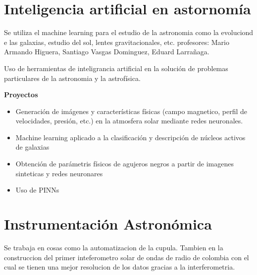 \documentclass{article}
\begin{document}
\section{Inteligencia artificial en astornomía }
Se utiliza el machine learning para el estudio de la astronomia como la evoluciond e las galaxias, estudio del sol, lentes gravitacionales, etc. profesores: Mario Armando Higuera, Santiago Vasgas Dominguez, Eduard Larrañaga. 

Uso de herramientas de inteligrancia artificial en la solución de problemas particulares de la astronomia y la astrofísica. 

\hfill

\textbf{Proyectos }
\begin{itemize}
  \item Generación de imágenes y características físicas (campo magnetico, perfil de velocidades, presión, etc.) en la atmosfera solar mediante redes neuronales. 
  \item Machine learning aplicado a la clasificación y descripción de núcleos activos de galaxias 
  \item Obtención de parámetris físicos de agujeros negros a partir de imagenes sinteticas y redes neuronares 
  \item Uso de PINNs
\end{itemize}

\section{Instrumentación Astronómica }
Se trabaja en cosas como la automatizacion de la cupula. Tambien en la construccion del primer inteferometro solar de ondas de radio de colombia con el cual se tienen una mejor resolucion de los datos gracias a la interferometria.
\end{document}
